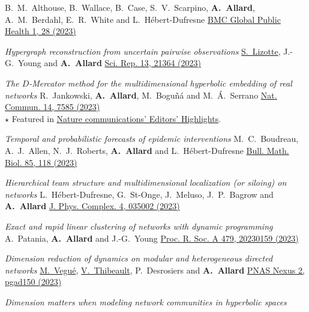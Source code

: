 \documentclass[11pt]{article}
\makeatletter
\newcommand{\reversearabic}[1]{\expandafter\@reversearabic\csname c@#1\endcsname}
\newcommand{\@reversearabic}[1]{%
  \number\numexpr\getrefnumber{this@etaremune@\romannumeral\c@etaremune}-#1+1\relax
}
\newcounter{etaremune}
\newenvironment{etaremune}[1][]{%
  \stepcounter{etaremune}%
  \begin{enumerate}[label=\reversearabic*.,#1]%
}{%
  \edef\@currentlabel{\the\csname c@\@enumctr\endcsname}%
  \label{this@etaremune@\romannumeral\c@etaremune}%
  \end{enumerate}%
}
\makeatother
\begin{document}
\begin{etaremune}[itemsep=0.5em, label={[A\reversearabic*]}]
{  B.~M.~Althouse, B.~Wallace, B.~Case, S.~V.~Scarpino, \textbf{A.~Allard}, A.~M.~Berdahl, E.~R.~White and L.~Hébert-Dufresne\split
  \href{https://doi.org/10.1186/s44263-023-00028-z}{BMC Global Public Health 1, 28 (2023)}}
%
  \item \parbox[t]{\textwidth-30pt}{\textit{Hypergraph reconstruction from uncertain pairwise observations}\split
  \uline{S.~Lizotte}, J.-G.~Young and \textbf{A.~Allard}\split
  \href{https://doi.org/10.1038/s41598-023-48081-w}{Sci. Rep. 13, 21364 (2023)}}
%
  \item \parbox[t]{\textwidth-30pt}{\textit{The $D$-Mercator method for the multidimensional hyperbolic embedding of real networks}\split
  R.~Jankowski, \textbf{A.~Allard}, M.~Bogu\~n\'a and M.~\'A.~Serrano\split
  \href{https://doi.org/10.1038/s41467-023-43337-5}{Nat. Commun. 14, 7585 (2023)}\\
  {\footnotesize $\star$ Featured in \href{https://www.nature.com/ncomms/editorshighlights}{Nature communications' Editors' Highlights}.}}
%
  \item \parbox[t]{\textwidth-30pt}{\textit{Temporal and probabilistic forecasts of epidemic interventions}\split
  M.~C.~Boudreau, A.~J.~Allen, N.~J.~Roberts, \textbf{A.~Allard} and L.~H\'ebert-Dufresne\split
  \href{https://doi.org/10.1007/s11538-023-01220-w}{Bull. Math. Biol. 85, 118 (2023)}}
%
  \item \parbox[t]{\textwidth-30pt}{\textit{Hierarchical team structure and multidimensional localization (or siloing) on networks}\split
  L.~Hébert-Dufresne, G.~St-Onge, J.~Meluso, J.~P.~Bagrow and \textbf{A.~Allard}\split
  \href{https://doi.org/10.1088/2632-072X/ace602}{J. Phys. Complex. 4, 035002 (2023)}}
%
  \item \parbox[t]{\textwidth-30pt}{\textit{Exact and rapid linear clustering of networks with dynamic programming}\split
  A.~Patania, \textbf{A.~Allard} and J.-G.~Young\split
  \href{https://doi.org/10.1098/rspa.2023.0159}{Proc. R. Soc. A 479, 20230159 (2023)}}
%
  \item \parbox[t]{\textwidth-30pt}{\textit{Dimension reduction of dynamics on modular and heterogeneous directed networks}\split
  \uline{M.~Vegué}, \uline{V.~Thibeault}, P.~Desrosiers and \textbf{A.~Allard}\split
  \href{https://doi.org/10.1093/pnasnexus/pgad150}{PNAS Nexus 2, pgad150 (2023)}}
%
  \item \parbox[t]{\textwidth-30pt}{\textit{Dimension matters when modeling network communities in hyperbolic spaces}\split
}
\end{etaremune}
\end{document}

